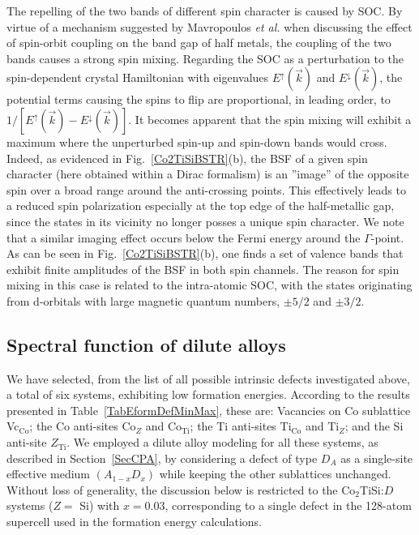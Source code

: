 \documentclass[aps,prb,twocolumn,superscriptaddress,showpacs]{revtex4}
\newcommand{\FG}[1]{Fig.~\ref{#1}}
\newcommand{\ea}{{\it et al.}}
\begin{document}
The repelling of the two bands of different 
spin character is caused by SOC. By virtue of
a mechanism suggested by Mavropoulos \ea\cite{MSZ+04} when discussing the 
effect of spin-orbit coupling on the band gap of half metals,
the coupling of the two bands causes a strong spin mixing.
Regarding the SOC as a perturbation to the spin-dependent
crystal Hamiltonian with eigenvalues $E^\uparrow(\vec k)$ and
$E^\downarrow(\vec k)$, the potential terms causing the 
spins to flip are proportional, in leading order, to
$1/[E^\uparrow(\vec k)-E^\downarrow(\vec k)]$. It becomes
apparent that the spin mixing will exhibit a maximum where the 
unperturbed spin-up and spin-down bands would cross.
Indeed, as evidenced in \FG{Co2TiSiBSTR}(b), 
the BSF of a given spin character (here obtained within a Dirac
formalism) is an ''image'' of 
the opposite spin over a broad range around the
anti-crossing points. This effectively leads to a reduced 
spin polarization especially at the top edge
of the half-metallic gap,\cite{MSZ+04} since
the states in its vicinity no longer posses a
unique spin character. 
We note that a similar imaging effect
occurs below the Fermi energy around the $\Gamma$-point. 
As can be seen in \FG{Co2TiSiBSTR}(b), 
one finds a set of valence bands that exhibit
finite amplitudes of the BSF in both spin channels.
The reason for spin mixing 
in this case is related to the 
intra-atomic SOC, with the states originating 
from d-orbitals with large magnetic quantum 
numbers, $\pm5/2$ and $\pm3/2$.

\subsection{Spectral function of dilute alloys}

We have selected, from the list of all possible intrinsic defects
investigated above, a total of six systems, exhibiting low formation
energies. According to the results presented in 
Table~\ref{TabEformDefMinMax}, these are: 
Vacancies on Co sublattice Vc$_\text{Co}$; the Co anti-sites 
Co$_Z$ and Co$_\text{Ti}$; the Ti anti-sites Ti$_\text{Co}$
and Ti$_Z$; and the Si anti-site $Z_\text{Ti}$. 
We employed a dilute alloy modeling for all these systems, 
as described in Section~\ref{SecCPA}, by considering a defect of
type $D_A$ as a single-site effective medium $(A_{1-x}D_x)$
while keeping the other sublattices unchanged.
Without loss of generality, 
the discussion below is restricted 
to the Co$_2$TiSi:$D$ systems ($Z=$ Si) with $x=0.03$,
corresponding to a single defect in the 128-atom 
supercell used in the formation energy calculations. 
\end{document}
